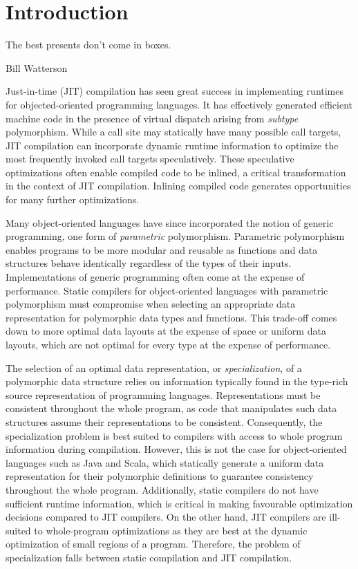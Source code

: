 \chapter{Introduction}

\epigraph{The best presents don't come in boxes.}{Bill Watterson}

Just-in-time (JIT) compilation has seen great success in implementing runtimes for objected-oriented programming languages.
It has effectively generated efficient machine code in the presence of virtual dispatch arising from \textit{subtype} polymorphism\cite{smalltalk:inline-caches,self:polymorphic-inline-caches}.
While a call site may statically have many possible call targets, JIT compilation can incorporate dynamic runtime information to optimize the most frequently invoked call targets speculatively.
These speculative optimizations often enable compiled code to be inlined, a critical transformation in the context of JIT compilation.
Inlining compiled code generates opportunities for many further optimizations.

Many object-oriented languages have since incorporated the notion of generic programming, one form of \textit{parametric} polymorphism.
Parametric polymorphism enables programs to be more modular and reusable as functions and data structures behave identically\cite{tapl} regardless of the types of their inputs.
Implementations of generic programming often come at the expense of performance.
Static compilers for object-oriented languages with parametric polymorphism must compromise when selecting an appropriate data representation for polymorphic data types and functions.
This trade-off comes down to more optimal data layouts at the expense of space or uniform data layouts, which are not optimal for every type at the expense of performance.

The selection of an optimal data representation, or \textit{specialization}, of a polymorphic data structure relies on information typically found in the type-rich source representation of programming languages.
Representations must be consistent throughout the whole program, as code that manipulates such data structures assume their representations to be consistent.
Consequently, the specialization problem is best suited to compilers with access to whole program information during compilation.
However, this is not the case for object-oriented languages such as Java and Scala, which statically generate a uniform data representation for their polymorphic definitions to guarantee consistency throughout the whole program. 
Additionally, static compilers do not have sufficient runtime information, which is critical in making favourable optimization decisions compared to JIT compilers.
On the other hand, JIT compilers are ill-suited to whole-program optimizations as they are best at the dynamic optimization of small regions of a program\cite{history:jit}.
Therefore, the problem of specialization falls between static compilation and JIT compilation.

